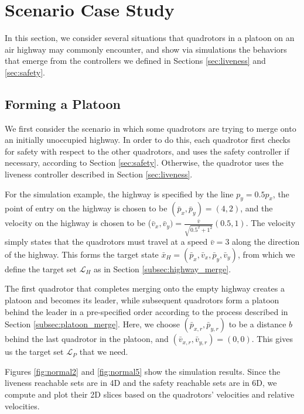 \section{Scenario Case Study \label{sec:scenarios}}
In this section, we consider several situations that quadrotors in a platoon on an air highway may commonly encounter, and show via simulations the behaviors that emerge from the controllers we defined in Sections \ref{sec:liveness} and \ref{sec:safety}.

\subsection{Forming a Platoon}
We first consider the scenario in which some quadrotors are trying to merge onto an initially unoccupied highway. In order to do this, each quadrotor first checks for safety with respect to the other quadrotors, and uses the safety controller if necessary, according to Section \ref{sec:safety}. Otherwise, the quadrotor uses the liveness controller described in Section \ref{sec:liveness}. 

For the simulation example, the highway is specified by the line $p_y = 0.5p_x$, the point of entry on the highway is chosen to be $(\bar{p}_x, \bar{p}_y) = (4,2)$, and the velocity on the highway is chosen to be ($\bar{v}_x, \bar{v}_y) = \frac{\bar{v}}{\sqrt{0.5^2 + 1^2}} (0.5, 1)$. The velocity simply states that the quadrotors must travel at a speed $\bar{v}=3$ along the direction of the highway. This forms the target state $\bar{x}_H=(\bar{p}_x, \bar{v}_x, \bar{p}_y, \bar{v}_y)$, from which we define the target set $\mathcal{L}_H$ as in Section \ref{subsec:highway_merge}.

The first quadrotor that completes merging onto the empty highway creates a platoon and becomes its leader, while subsequent quadrotors form a platoon behind the leader in a pre-specified order according to the process described in Section \ref{subsec:platoon_merge}. Here, we choose $(\bar{p}_{x,r}, \bar{p}_{y,r})$ to be a distance $b$ behind the last quadrotor in the platoon, and $(\bar{v}_{x,r}, \bar{v}_{y,r}) = (0,0)$. This gives us the target set $\mathcal{L}_P$ that we need.

Figures \ref{fig:normal2} and \ref{fig:normal5} show the simulation results. Since the liveness reachable sets are in 4D and the safety reachable sets are in 6D, we compute and plot their 2D slices based on the quadrotors' velocities and relative velocities. 

